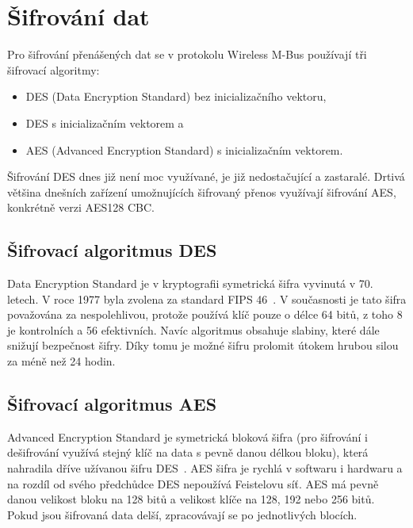 \section{Šifrování dat}
Pro šifrování přenášených dat se v protokolu Wireless M-Bus používají tři šifrovací algoritmy:
\begin{itemize}
	\item DES (Data Encryption Standard) bez inicializačního vektoru,
	\item DES s inicializačním vektorem a
	\item AES (Advanced Encryption Standard) s inicializačním vektorem.
\end{itemize}

Šifrování DES dnes již není moc využívané, je již nedostačující a zastaralé. Drtivá většina dnešních zařízení umožnujících šifrovaný přenos využívají šifrování AES, konkrétně verzi AES128 CBC.

\subsection{Šifrovací algoritmus DES}
Data Encryption Standard je v kryptografii symetrická šifra vyvinutá v 70. letech. V roce 1977 byla zvolena za standard FIPS 46~\cite{NormaFIPS46}. V současnosti je tato šifra považována za nespolehlivou, protože používá klíč pouze o délce 64 bitů, z toho 8 je kontrolních a 56 efektivních. Navíc algoritmus obsahuje slabiny, které dále snižují bezpečnost šifry. Díky tomu je možné šifru prolomit útokem hrubou silou za méně než 24 hodin.

\subsection{Šifrovací algoritmus AES}
Advanced Encryption Standard je symetrická bloková šifra (pro šifrování i dešifrování využívá stejný klíč na data s pevně danou délkou bloku), která nahradila dříve užívanou šifru DES~\cite{NormaFIPS}. AES šifra je rychlá v softwaru i hardwaru a na rozdíl od svého předchůdce DES nepoužívá Feistelovu síť. AES má pevně danou velikost bloku na 128 bitů a velikost klíče na 128, 192 nebo 256 bitů.   Pokud jsou šifrovaná data delší, zpracovávají se po jednotlivých blocích. 

